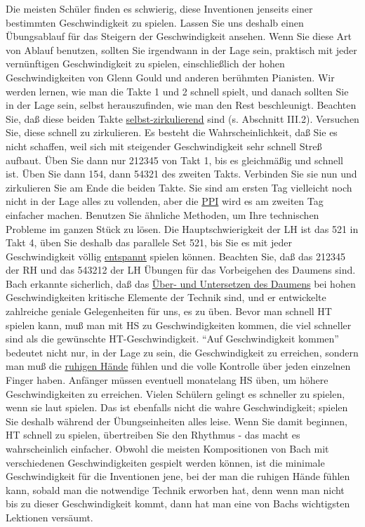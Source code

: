 Die meisten Schüler finden es schwierig, diese Inventionen jenseits einer bestimmten Geschwindigkeit zu spielen.
Lassen Sie uns deshalb einen Übungsablauf für das Steigern der Geschwindigkeit ansehen.
Wenn Sie diese Art von Ablauf benutzen, sollten Sie irgendwann in der Lage sein, praktisch mit jeder vernünftigen Geschwindigkeit zu spielen, einschließlich der hohen Geschwindigkeiten von Glenn Gould und anderen berühmten Pianisten.
Wir werden lernen, wie man die Takte 1 und 2 schnell spielt, und danach sollten Sie in der Lage sein, selbst herauszufinden, wie man den Rest beschleunigt.
Beachten Sie, daß diese beiden Takte \hyperref[c1iii2]{selbst-zirkulierend} sind (s. Abschnitt III.2).
Versuchen Sie, diese schnell zu zirkulieren.
Es besteht die Wahrscheinlichkeit, daß Sie es nicht schaffen, weil sich mit steigender Geschwindigkeit sehr schnell Streß aufbaut.
Üben Sie dann nur 212345 von Takt 1, bis es gleichmäßig und schnell ist.
Üben Sie dann 154, dann 54321 des zweiten Takts.
Verbinden Sie sie nun und zirkulieren Sie am Ende die beiden Takte.
Sie sind am ersten Tag vielleicht noch nicht in der Lage alles zu vollenden, aber die \hyperref[c1ii15]{PPI} wird es am zweiten Tag einfacher machen.
Benutzen Sie ähnliche Methoden, um Ihre technischen Probleme im ganzen Stück zu lösen.
Die Hauptschwierigkeit der LH ist das 521 in Takt 4, üben Sie deshalb das parallele Set 521, bis Sie es mit jeder Geschwindigkeit völlig \hyperref[c1ii14]{entspannt} spielen können.
Beachten Sie, daß das 212345 der RH und das 543212 der LH Übungen für das Vorbeigehen des Daumens sind.
Bach erkannte sicherlich, daß das \hyperref[c1iii5a]{Über- und Untersetzen des Daumens} bei hohen Geschwindigkeiten kritische Elemente der Technik sind, und er entwickelte zahlreiche geniale Gelegenheiten für uns, es zu üben.
Bevor man schnell HT spielen kann, muß man mit HS zu Geschwindigkeiten kommen, die viel schneller sind als die gewünschte HT-Geschwindigkeit.
\enquote{Auf Geschwindigkeit kommen} bedeutet nicht nur, in der Lage zu sein, die Geschwindigkeit zu erreichen, sondern man muß die \hyperref[ruhig]{ruhigen Hände} fühlen und die volle Kontrolle über jeden einzelnen Finger haben.
Anfänger müssen eventuell monatelang HS üben, um höhere Geschwindigkeiten zu erreichen.
Vielen Schülern gelingt es schneller zu spielen, wenn sie laut spielen.
Das ist ebenfalls nicht die wahre Geschwindigkeit; spielen Sie deshalb während der Übungseinheiten alles leise.
Wenn Sie damit beginnen, HT schnell zu spielen, übertreiben Sie den Rhythmus - das macht es wahrscheinlich einfacher.
Obwohl die meisten Kompositionen von Bach mit verschiedenen Geschwindigkeiten gespielt werden können, ist die minimale Geschwindigkeit für die Inventionen jene, bei der man die ruhigen Hände fühlen kann, sobald man die notwendige Technik erworben hat, denn wenn man nicht bis zu dieser Geschwindigkeit kommt, dann hat man eine von Bachs wichtigsten Lektionen versäumt.

